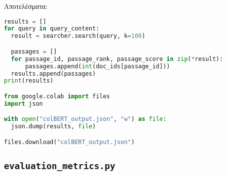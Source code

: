 Αποτελέσματα:
\begin{lstlisting}[language=Python]
results = []
for query in query_content:
  result = searcher.search(query, k=100)

  passages = []
  for passage_id, passage_rank, passage_score in zip(*result):
      passages.append(int(doc_ids[passage_id]))
  results.append(passages)
print(results)

from google.colab import files
import json

with open("colBERT_output.json", "w") as file:
  json.dump(results, file)

files.download("colBERT_output.json")
\end{lstlisting}


\subsection{\texttt{evaluation\_metrics.py}}
